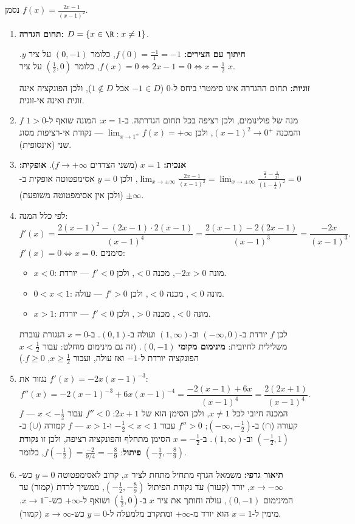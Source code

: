 \begin{solution}
נסמן $f(x)=\frac{2x-1}{(x-1)^2}$.
\begin{enumerate}
  \item \textbf{תחום הגדרה:} $D=\{x\in\R: x\neq1\}$.

  \textbf{חיתוך עם הצירים:} $f(0)=\frac{-1}{1}=-1$, כלומר $(0,-1)$ על ציר $y$. $f(x)=0\iff 2x-1=0\iff x=\frac12$, כלומר $(\frac12,0)$ על ציר $x$.

  \textbf{זוגיות:} תחום ההגדרה אינו סימטרי ביחס ל-$0$ ($-1\in D$ אבל $1\notin D$), ולכן הפונקציה אינה זוגית ואינה אי-זוגית.

  \item $f$ מנה של פולינומים, ולכן רציפה בכל תחום הגדרתה. ב-$x=1$: המונה שואף ל-$1>0$ והמכנה $(x-1)^2\to0^+$, ולכן $\lim_{x\to1^\pm}f(x)=+\infty$ --- נקודת אי-רציפות מסוג שני (אינסופית).

  \item \textbf{אנכית:} $x=1$ (משני הצדדים $f\to+\infty$).
  \textbf{אופקית:} $\lim_{x\to\pm\infty}\frac{2x-1}{(x-1)^2}=\lim_{x\to\pm\infty}\frac{\frac2x-\frac1{x^2}}{(1-\frac1x)^2}=0$, ולכן $y=0$ אסימפטוטה אופקית ב-$\pm\infty$ (ולכן אין אסימפטוטה משופעת).

  \item לפי כלל המנה:
  \[ f'(x)=\frac{2(x-1)^2-(2x-1)\cdot2(x-1)}{(x-1)^4}=\frac{2(x-1)-2(2x-1)}{(x-1)^3}=\frac{-2x}{(x-1)^3}. \]
  $f'(x)=0\iff x=0$. סימנים:
  \begin{itemize}
    \item $x<0$: מונה $-2x>0$, מכנה $<0$, ולכן $f'<0$ --- יורדת.
    \item $0<x<1$: מונה $<0$, מכנה $<0$, ולכן $f'>0$ --- עולה.
    \item $x>1$: מונה $<0$, מכנה $>0$, ולכן $f'<0$ --- יורדת.
  \end{itemize}
  לכן $f$ יורדת ב-$(-\infty,0)$ וב-$(1,\infty)$ ועולה ב-$(0,1)$. ב-$x=0$ הנגזרת עוברת משלילית לחיובית: \textbf{מינימום מקומי} $(0,-1)$. (זה גם מינימום מוחלט: עבור $x<\frac12$ הפונקציה יורדת ל-$-1$ ואז עולה, ועבור $x\ge\frac12$, $f\ge0$.)

  \item נגזור את $f'(x)=-2x(x-1)^{-3}$:
  \[ f''(x)=-2(x-1)^{-3}+6x(x-1)^{-4}=\frac{-2(x-1)+6x}{(x-1)^4}=\frac{2(2x+1)}{(x-1)^4}. \]
  המכנה חיובי לכל $x\neq1$, ולכן הסימן הוא של $2x+1$:
  $f''<0$ עבור $x<-\frac12$ --- $f$ קעורה ($\cap$) ב-$(-\infty,-\frac12)$;
  $f''>0$ עבור $-\frac12<x<1$ ו-$x>1$ --- $f$ קמורה ($\cup$) ב-$(-\frac12,1)$ וב-$(1,\infty)$.
  ב-$x=-\frac12$ הסימן מתחלף והפונקציה רציפה, ולכן זו \textbf{נקודת פיתול}: $f(-\frac12)=\frac{-2}{9/4}=-\frac89$, כלומר $(-\frac12,-\frac89)$.

  \item \textbf{תיאור גרפי:} משמאל הגרף מתחיל מתחת לציר $x$, קרוב לאסימפטוטה $y=0$ כש-$x\to-\infty$, יורד (קעור) עד נקודת הפיתול $(-\frac12,-\frac89)$, ממשיך לרדת (קמור) עד המינימום $(0,-1)$, עולה וחותך את ציר $x$ ב-$(\frac12,0)$ ושואף ל-$+\infty$ כש-$x\to1^-$. מימין ל-$x=1$ הוא יורד מ-$+\infty$ ומתקרב מלמעלה ל-$y=0$ כש-$x\to\infty$ (קמור).
\end{enumerate}
\end{solution}
